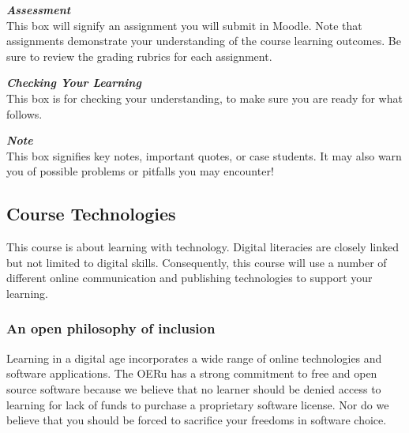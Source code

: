 \documentclass[
]{book}
\theoremstyle{definition}
\theoremstyle{definition}
\theoremstyle{definition}
\theoremstyle{definition}
\theoremstyle{remark}
\begin{document}
\begin{assessment}
\textbf{\emph{Assessment}}\\
This box will signify an assignment you will submit in Moodle. Note that
assignments demonstrate your understanding of the course learning
outcomes. Be sure to review the grading rubrics for each assignment.
\end{assessment}

\begin{progress}
\textbf{\emph{Checking Your Learning}}\\
This box is for checking your understanding, to make sure you are ready
for what follows.
\end{progress}

\begin{feedback}
\textbf{\emph{Note}}\\
This box signifies key notes, important quotes, or case students. It may
also warn you of possible problems or pitfalls you may encounter!
\end{feedback}

\hypertarget{course-technologies}{%
\subsection*{Course Technologies}\label{course-technologies}}

This course is about learning with technology. Digital literacies are closely linked but not limited to digital skills. Consequently, this course will use a number of different online communication and publishing technologies to support your learning.

\hypertarget{an-open-philosophy-of-inclusion}{%
\subsubsection*{An open philosophy of inclusion}\label{an-open-philosophy-of-inclusion}}

Learning in a digital age incorporates a wide range of online technologies and software applications. The OERu has a strong commitment to free and open source software because we believe that no learner should be denied access to learning for lack of funds to purchase a proprietary software license. Nor do we believe that you should be forced to sacrifice your freedoms in software choice.
\end{document}
